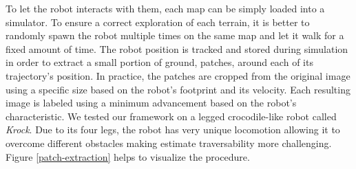 \documentclass[../document.tex]{subfiles}
\begin{document}
To let the robot interacts with them, each map can be simply loaded into a simulator. To ensure a correct exploration of each terrain, it is better to randomly spawn the robot multiple times on the same map and let it walk for a fixed amount of time. The robot position is tracked and stored during simulation in order to extract a small portion of ground, patches, around each of its trajectory's position. In practice, the patches are cropped from the original image using a specific size based on the robot's footprint and its velocity. Each resulting image is labeled using a minimum advancement based on the robot's characteristic. We tested our framework on a legged crocodile-like robot called \emph{Krock}. Due to its four legs, the robot has very unique locomotion allowing it to overcome different obstacles making estimate traversability more challenging. Figure \ref{patch-extraction} helps to visualize the procedure.
\end{document}
